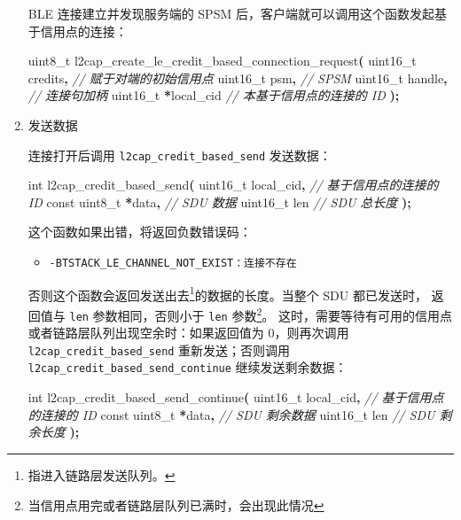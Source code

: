 \documentclass[
  12pt,
]{book}
\newenvironment{Shaded}{\begin{snugshade}}{\end{snugshade}}
\newcommand{\CommentTok}[1]{\textcolor[rgb]{0.56,0.35,0.01}{\textit{#1}}}
\newcommand{\DataTypeTok}[1]{\textcolor[rgb]{0.13,0.29,0.53}{#1}}
\newcommand{\NormalTok}[1]{#1}
\newcommand{\OperatorTok}[1]{\textcolor[rgb]{0.81,0.36,0.00}{\textbf{#1}}}
\providecommand{\tightlist}{%
  \setlength{\itemsep}{0pt}\setlength{\parskip}{0pt}}
\begin{document}
\begin{enumerate}
  BLE 连接建立并发现服务端的 SPSM 后，客户端就可以调用这个函数发起基于信用点的连接：

\begin{Shaded}
\begin{Highlighting}[]
\DataTypeTok{uint8\_t}\NormalTok{ l2cap\_create\_le\_credit\_based\_connection\_request}\OperatorTok{(}
  \DataTypeTok{uint16\_t}\NormalTok{ credits}\OperatorTok{,}   \CommentTok{// 赋于对端的初始信用点}
  \DataTypeTok{uint16\_t}\NormalTok{ psm}\OperatorTok{,}       \CommentTok{// SPSM}
  \DataTypeTok{uint16\_t}\NormalTok{ handle}\OperatorTok{,}    \CommentTok{// 连接句加柄}
  \DataTypeTok{uint16\_t} \OperatorTok{*}\NormalTok{local\_cid }\CommentTok{// 本基于信用点的连接的 ID}
\OperatorTok{);}
\end{Highlighting}
\end{Shaded}
\item
  发送数据

  连接打开后调用 \texttt{l2cap\_credit\_based\_send} 发送数据：

\begin{Shaded}
\begin{Highlighting}[]
\DataTypeTok{int}\NormalTok{ l2cap\_credit\_based\_send}\OperatorTok{(}
  \DataTypeTok{uint16\_t}\NormalTok{ local\_cid}\OperatorTok{,}   \CommentTok{// 基于信用点的连接的 ID}
  \DataTypeTok{const} \DataTypeTok{uint8\_t} \OperatorTok{*}\NormalTok{data}\OperatorTok{,}  \CommentTok{// SDU 数据}
  \DataTypeTok{uint16\_t}\NormalTok{ len          }\CommentTok{// SDU 总长度}
\OperatorTok{);}
\end{Highlighting}
\end{Shaded}

  这个函数如果出错，将返回负数错误码：

  \begin{itemize}
  \tightlist
  \item
    \texttt{-BTSTACK\_LE\_CHANNEL\_NOT\_EXIST：连接不存在}
  \end{itemize}

  否则这个函数会返回发送出去\footnote{指进入链路层发送队列。}的数据的长度。当整个 SDU 都已发送时，
  返回值与 \texttt{len} 参数相同，否则小于 \texttt{len} 参数\footnote{当信用点用完或者链路层队列已满时，会出现此情况}。
  这时，需要等待有可用的信用点或者链路层队列出现空余时：如果返回值为 0，则再次调用
  \texttt{l2cap\_credit\_based\_send} 重新发送；否则调用 \texttt{l2cap\_credit\_based\_send\_continue}
  继续发送剩余数据：

\begin{Shaded}
\begin{Highlighting}[]
\DataTypeTok{int}\NormalTok{ l2cap\_credit\_based\_send\_continue}\OperatorTok{(}
  \DataTypeTok{uint16\_t}\NormalTok{ local\_cid}\OperatorTok{,}   \CommentTok{// 基于信用点的连接的 ID}
  \DataTypeTok{const} \DataTypeTok{uint8\_t} \OperatorTok{*}\NormalTok{data}\OperatorTok{,}  \CommentTok{// SDU 剩余数据}
  \DataTypeTok{uint16\_t}\NormalTok{ len          }\CommentTok{// SDU 剩余长度}
\OperatorTok{);}
\end{Highlighting}
\end{Shaded}


\end{enumerate}
\end{document}
